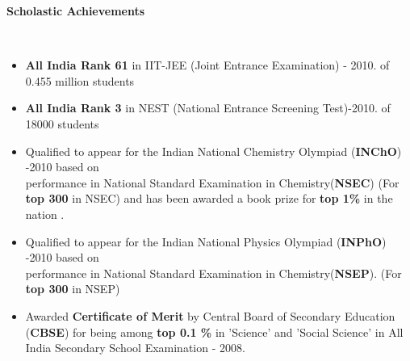 \documentclass[a4paper,11pt]{article}
\newcommand{\lsep}{-0.5cm}
\newcommand{\resheading}[1]{{\small \colorbox{mygrey}{\begin{minipage}{0.975\textwidth}{\textbf{#1 \vphantom{p\^{E}}}}\end{minipage}}}}
\begin{document}
\resheading{\textbf{\large Scholastic Achievements}}\\[\lsep]
\begin{itemize}
  \item \textbf{All India Rank 61} in IIT-JEE (Joint Entrance Examination) - 2010. of 0.455 million students\\[-0.7cm]
  \item \textbf{All India Rank 3} in NEST (National Entrance Screening Test)-2010. of 18000 students \\[-0.7cm]

 \item Qualified to appear for the Indian National Chemistry Olympiad (\textbf{INChO}) -2010 based on \\performance in National Standard Examination in Chemistry(\textbf{NSEC}) (For \textbf{top 300} in NSEC) and has been awarded a book prize for \textbf{top 1\%} in the nation .\\[-0.7cm]
  \item Qualified to appear for the Indian National Physics Olympiad (\textbf{INPhO}) -2010 based on \\ performance in National Standard Examination in Chemistry(\textbf{NSEP}). (For \textbf{top 300} in NSEP) 
  
  \item Awarded \textbf{Certificate of Merit} by Central Board of Secondary Education (\textbf{CBSE}) for being among \textbf{top 0.1 \%} in 'Science' and 'Social Science' in All India Secondary School Examination - 2008. \\[-0.7cm]


\end{itemize}
\end{document}
